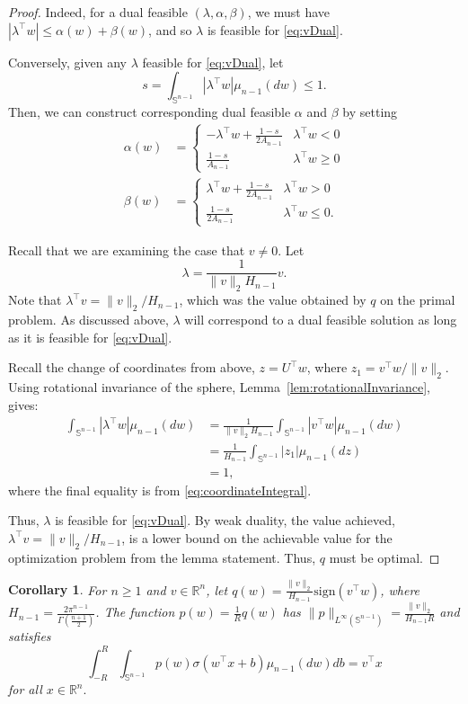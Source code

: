 \documentclass[twoside]{article}
\newtheorem{corollary}{Corollary}
\theoremstyle{definition}
\newcommand{\R}{\mathbb{R}}
\renewcommand{\S}{\mathbb{S}}
\newcommand{\sign}{\mathrm{sign}}
\newcommand{\1}[1]{\scalebox{1.25}{$\mathds{1}$}\left[#1\right]}
\begin{document}
\begin{proof}
Indeed, for a dual feasible $(\lambda,\alpha,\beta)$, we must have $|\lambda^\top w|\le \alpha(w)+\beta(w)$, and so $\lambda$ is feasible for \eqref{eq:vDual}.

Conversely, given any $\lambda$ feasible for \eqref{eq:vDual}, let 
$$
s=\int_{\S^{n-1}}|\lambda^\top w|\mu_{n-1}(dw)\le 1.
$$
Then, we can construct corresponding dual feasible $\alpha$ and $\beta$ by setting
\begin{align*}
\alpha(w)&=\begin{cases}
-\lambda^\top w +\frac{1-s}{2A_{n-1}}& \lambda^\top w <0 \\
\frac{1-s}{A_{n-1}} & \lambda^\top w \ge 0
\end{cases}\\
\beta(w)&=\begin{cases}
\lambda^\top w + \frac{1-s}{2A_{n-1}} &\lambda^\top w > 0 \\
\frac{1-s}{2A_{n-1}}& \lambda^\top w \le 0.
\end{cases}
\end{align*}

Recall that we are examining the case that $v\ne 0.$
Let 
$$
\lambda = \frac{1}{\|v\|_2 H_{n-1}}v.
$$
Note that $\lambda^\top v = \|v\|_2/H_{n-1}$, which was the value obtained by $q$ on the primal problem. As discussed above, $\lambda$ will correspond to a dual feasible solution as long as it is feasible for \eqref{eq:vDual}.

Recall the change of coordinates from above, $z=U^\top w$, where $z_1=v^\top w/\|v\|_2$. Using rotational invariance of the sphere, Lemma~\ref{lem:rotationalInvariance},
gives:
\begin{align*}
\int_{\S^{n-1}}|\lambda^\top w|\mu_{n-1}(dw)&=\frac{1}{\|v\|_2 H_{n-1}}\int_{\S^{n-1}}|v^\top w|\mu_{n-1}(dw)\\
&=\frac{1}{H_{n-1}}\int_{\S^{n-1}}|z_1|\mu_{n-1}(dz) \\
&=1,
\end{align*}
where the final equality is from \eqref{eq:coordinateIntegral}.

Thus, $\lambda$ is feasible for \eqref{eq:vDual}. By weak duality, the value achieved, $\lambda^\top v=\|v\|_2/H_{n-1}$,
is a lower bound on the achievable value for the optimization problem from the lemma statement. Thus, $q$ must be  optimal. 
\end{proof}

\begin{corollary}
\label{cor:linRep}
For $n\ge 1$ and $v\in \R^n$, let $q(w)=\frac{\|v\|_2}{H_{n-1}}\sign(v^\top w)$, where $H_{n-1}=\frac{2\pi^{n-1}}{\Gamma\left(\frac{n+1}{2}\right)}$. The function $p(w)=\frac{1}{R}q(w)$ has $\|p\|_{L^{\infty}(\S^{n-1})}=\frac{\|v\|_2}{H_{n-1} R}$ and satisfies
$$
\int_{-R}^R\int_{\S^{n-1}}p(w)\sigma(w^\top x+b)\mu_{n-1}(dw)db=v^\top x
$$
for all $x\in\R^n.$
\end{corollary}
\end{document}
